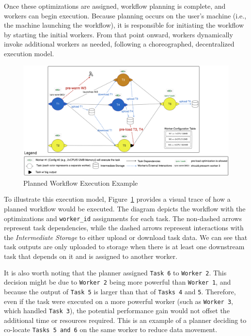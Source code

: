\documentclass[conference]{IEEEtran}
\begin{document}
Once these optimizations are assigned, workflow planning is complete, and workers can begin execution. Because planning occurs on the user's machine (i.e., the machine launching the workflow), it is responsible for initiating the workflow by starting the initial workers. From that point onward, workers dynamically invoke additional workers as needed, following a choreographed, decentralized execution model.

\begin{figure}[h]
    \centering
    \includegraphics[width=\textwidth]{figures/solution_workflowinstanceexample.png}
    \caption{Planned Workflow Execution Example}
    \label{fig:planned_workflow_execution_example}
\end{figure}

To illustrate this execution model, Figure~\ref{fig:planned_workflow_execution_example} provides a visual trace of how a planned workflow would be executed. The diagram depicts the workflow with the optimizations and \texttt{worker\_id} assignments for each task. The non-dashed arrows represent task dependencies, while the dashed arrows represent interactions with the \textit{Intermediate Storage} to either upload or download task data. We can see that task outputs are only uploaded to storage when there is at least one downstream task that depends on it and is assigned to another worker. 

It is also worth noting that the planner assigned \texttt{Task 6} to \texttt{Worker 2}. This decision might be due to \texttt{Worker 2} being more powerful than \texttt{Worker 1}, and because the output of \texttt{Task 5} is larger than that of \texttt{Tasks 4} and \texttt{5}. Therefore, even if the task were executed on a more powerful worker (such as \texttt{Worker 3}, which handled \texttt{Task 3}), the potential performance gain would not offset the additional time or resources required. This is an example of a planner deciding to co-locate \texttt{Tasks 5 and 6} on the same worker to reduce data movement.
\end{document}
